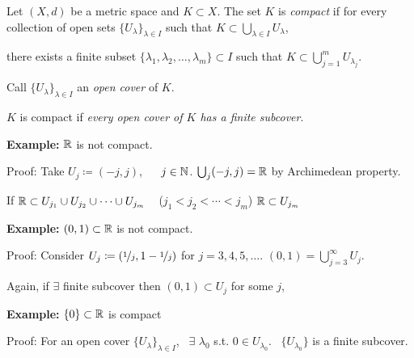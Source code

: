 \documentclass[10pt,aspectratio=149]{beamer}
\begin{document}
\begin{frame}

\begin{definition}
Let $(X,d)$ be a metric space and $K \subset X$. 
\pause
The set $K$ is \emph{compact}
if for every collection
of open sets $\{ U_{\lambda} \}_{\lambda \in I}$ such that
\quad
$\displaystyle
K \subset \bigcup_{\lambda \in I} U_\lambda$,

\pause
there exists a finite subset
$\{ \lambda_1, \lambda_2,\ldots,\lambda_m \} \subset I$
such that
\quad
$\displaystyle
K \subset \bigcup_{j=1}^m U_{\lambda_j}$.
\end{definition}

\pause
Call $\{ U_{\lambda} \}_{\lambda \in I}$ an \emph{open cover} of $K$.


\pause
$K$ is compact if \emph{every open cover of $K$ has a finite subcover}.

\pause
\medskip

\textbf{Example:}
${\mathbb{R}}$ is not compact.

\pause
Proof: Take $U_j \coloneqq (-j,j)$, ~~ $j \in {\mathbb{N}}$.
\pause
\quad
$\bigcup_j (-j,j) = {\mathbb{R}}$ by Archimedean property.

\pause
If ${\mathbb{R}} \subset U_{j_1} \cup U_{j_2} \cup \cdots \cup U_{j_m}$ ~
($j_1 < j_2 < \cdots < j_m$) \wthus ${\mathbb{R}} \subset U_{j_m}$
\pause
\quad
\contradiction

\pause
\medskip

\textbf{Example:}
$(0,1) \subset {\mathbb{R}}$ is not compact.

\pause
Proof:  Consider $U_{j} \coloneqq (\nicefrac{1}{j},1-\nicefrac{1}{j})$ for $j=3,4,5,\ldots$.
\pause
\quad
$(0,1) = \bigcup_{j=3}^\infty U_j$.

\pause
Again, if $\exists$ finite subcover then $(0,1) \subset U_j$ for some
$j$,
\pause
\qquad \contradiction

\pause
\medskip

\textbf{Example:}
$\{ 0 \} \subset {\mathbb{R}}$ is compact

\pause
Proof: For an open cover $\{ U_{\lambda} \}_{\lambda \in I}$,
\pause
~$\exists$ $\lambda_0$ s.t. $0 \in U_{\lambda_0}$.
\pause
~$\{ U_{\lambda_0} \}$ is a finite subcover.

\end{frame}
\end{document}
